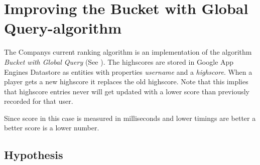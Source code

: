 \chapter{\label{method}Improving the Bucket with Global Query-algorithm}

The Companys current ranking algorithm is an implementation of the algorithm \emph{Bucket with Global Query} (See ). The highscores are stored in Google App Engines Datastore as entities with properties \emph{username} and a \emph{highscore}. When a player gets a new highscore it replaces the old highscore. Note that this implies that highscore entries never will get updated with a lower score than previously recorded for that user.

Since score in this case is measured in milliseconds and lower timings are better a better score is a lower number.

\section{Hypothesis} 

